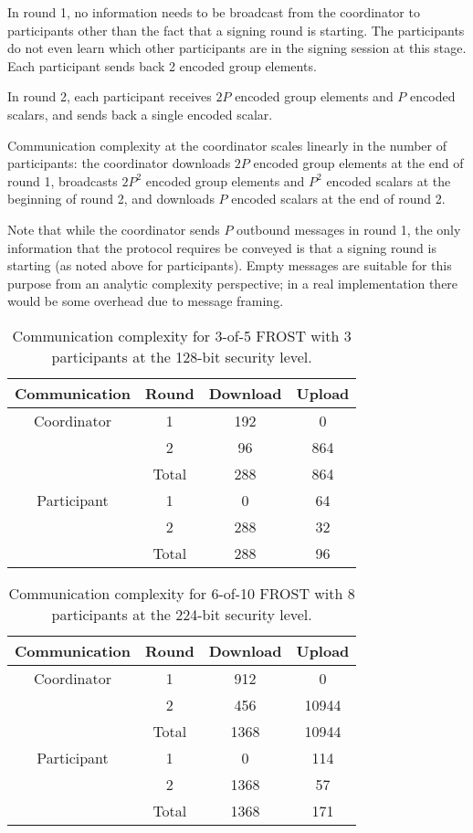 In round 1, no information needs to be broadcast from the coordinator to
participants other than the fact that a signing round is starting. The
participants do not even learn which other participants are in the signing
session at this stage. Each participant sends back 2 encoded group elements.

In round 2, each participant receives $2P$ encoded group elements and $P$
encoded scalars, and sends back a single encoded scalar.

Communication complexity at the coordinator scales linearly in the number of
participants: the coordinator downloads $2P$ encoded group elements at the end
of round 1, broadcasts $2P^2$ encoded group elements and $P^2$ encoded scalars
at the beginning of round 2, and downloads $P$ encoded scalars at the end of
round 2.

Note that while the coordinator sends $P$ outbound messages in round 1, the only
information that the protocol requires be conveyed is that a signing round is
starting (as noted above for participants). Empty messages are suitable for this
purpose from an analytic complexity perspective; in a real implementation there
would be some overhead due to message framing.

\begin{table}
	\centering
	\begin{tabular}{c c c c}
		\toprule
		Communication & Round & Download & Upload \\ \midrule
		Coordinator & 1 & 192 & 0 \\
		            & 2 & 96 & 864 \\
		            & Total & 288 & 864 \\
		\midrule
		Participant & 1 & 0 & 64 \\
		            & 2 & 288 & 32 \\
		            & Total & 288 & 96 \\
		\bottomrule
	\end{tabular}
	\caption{Communication complexity for 3-of-5 FROST with 3 participants at the 128-bit security level.}
\end{table}

\begin{table}
	\centering
	\begin{tabular}{c c c c}
		\toprule
		Communication & Round & Download & Upload \\ \midrule
		Coordinator & 1 & 912 & 0 \\
		            & 2 & 456 & 10944 \\
		            & Total & 1368 & 10944 \\
		\midrule
		Participant & 1 & 0 & 114 \\
		            & 2 & 1368 & 57 \\
		            & Total & 1368 & 171 \\
		\bottomrule
	\end{tabular}
	\caption{Communication complexity for 6-of-10 FROST with 8 participants at the 224-bit security level.}
\end{table}


